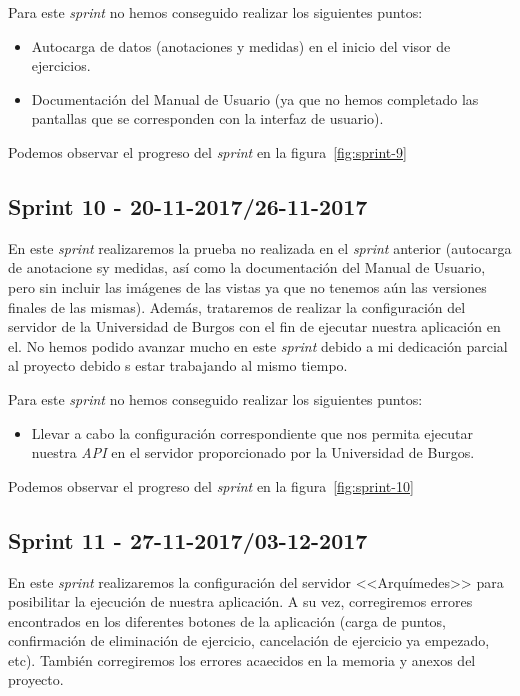 Para este \textit{sprint} no hemos conseguido realizar  los siguientes puntos:
\begin{itemize}
	\item Autocarga de datos (anotaciones y medidas) en el inicio del visor de ejercicios.
	\item Documentación del Manual de Usuario (ya que no hemos completado las pantallas que se corresponden con la interfaz de usuario).
\end{itemize}

Podemos observar el progreso del \textit{sprint} en la figura~\ref{fig:sprint-9}

\subsection{Sprint 10 - 20-11-2017/26-11-2017}
En este \textit{sprint} realizaremos la prueba no realizada en el \textit{sprint} anterior (autocarga de anotacione sy medidas, así como la documentación del Manual de Usuario, pero sin incluir las imágenes de las vistas ya que no tenemos aún las versiones finales de las mismas). Además, trataremos de realizar la configuración del servidor de la Universidad de Burgos con el fin de ejecutar nuestra aplicación en el. No hemos podido avanzar mucho en este \textit{sprint} debido a mi dedicación parcial al proyecto debido s estar trabajando al mismo tiempo.

Para este \textit{sprint} no hemos conseguido realizar  los siguientes puntos:
\begin{itemize}
	\item Llevar a cabo la configuración correspondiente que nos permita ejecutar nuestra \textit{API} en el servidor proporcionado por la Universidad de Burgos.
\end{itemize}

Podemos observar el progreso del \textit{sprint} en la figura~\ref{fig:sprint-10}

\subsection{Sprint 11 - 27-11-2017/03-12-2017}
En este \textit{sprint} realizaremos la configuración del servidor <<Arquímedes>> para posibilitar la ejecución de nuestra aplicación. A su vez, corregiremos errores encontrados en los diferentes botones de la aplicación (carga de puntos, confirmación de eliminación de ejercicio, cancelación de ejercicio ya empezado, etc). También corregiremos los errores acaecidos en la memoria y anexos del proyecto.

